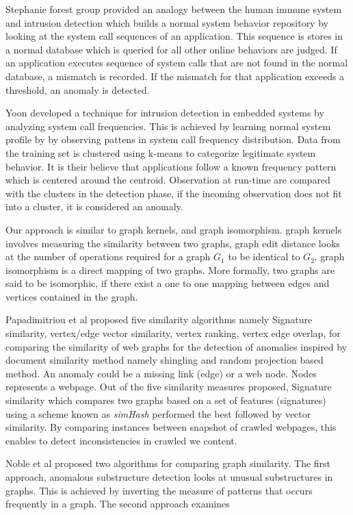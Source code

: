 Stephanie forest group \cite{Hofmeyr} provided an analogy between the human immune system and intrusion detection which builds a normal system behavior repository by looking at the system call sequences of an application. This sequence is stores in a normal database which is queried for all other online behaviors are judged. If an application executes sequence of system calls that are not found in the normal database, a mismatch is recorded. If the mismatch for that application exceeds a threshold, an anomaly is detected.

Yoon \cite{Yoon} developed a technique for intrusion detection in embedded systems by analyzing system call frequencies. This is achieved by learning normal system profile by by observing pattens in system call frequency distribution.  Data from the training set is  clustered using k-means to categorize legitimate system behavior. It is their believe that applications follow a known frequency pattern which is centered around the centroid. Observation at run-time are compared with the clusters in the detection phase, if the incoming observation does not fit into a cluster, it is considered an anomaly.


Our approach is similar to graph kernels, and graph isomorphism. graph kernels involves measuring the similarity between two graphs, graph edit distance looks at the number of operations required for a graph $G_1$ to be identical to $G_2$. graph isomorphism is a direct mapping of two graphs. More formally, two graphs are said to be isomorphic, if there exist a one to one mapping between edges and vertices contained in the graph.


Papadimitriou et al \cite{Papadimitriou2010} proposed five similarity algorithms namely Signature similarity, vertex/edge vector similarity, vertex ranking, vertex edge overlap,  for comparing the similarity of web graphs for the detection of anomalies inspired by document similarity method namely shingling and random projection based method. An anomaly could be a missing link (edge) or a web node. Nodes represents a webpage. Out of the five similarity measures proposed, Signature similarity which compares two graphs based on a set of features (signatures) using a scheme known as \textit{simHash} performed the best followed by vector similarity. By comparing instances between snapshot of crawled webpages, this enables to detect inconsistencies in crawled we content.

Noble et al \cite{Noble} proposed two algorithms for comparing graph similarity. The first approach, anomalous substructure detection looks at unusual substructures in graphs. This is achieved by inverting the measure of patterns that occurs frequently in a graph. The second approach examines  









